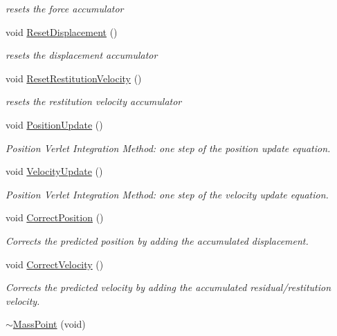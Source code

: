 \begin{DoxyCompactItemize}
\begin{DoxyCompactList}\small\item\em resets the force accumulator \end{DoxyCompactList}\item 
void \hyperlink{class_filum_1_1_mass_point_ade0c5dcd58e542d10a2976b891c3230b}{Reset\-Displacement} ()
\begin{DoxyCompactList}\small\item\em resets the displacement accumulator \end{DoxyCompactList}\item 
void \hyperlink{class_filum_1_1_mass_point_a368a05270d3a88e8dca67f89cd938ab9}{Reset\-Restitution\-Velocity} ()
\begin{DoxyCompactList}\small\item\em resets the restitution velocity accumulator \end{DoxyCompactList}\item 
void \hyperlink{class_filum_1_1_mass_point_ac2bc946eb3183d5404be4a737c737b96}{Position\-Update} ()
\begin{DoxyCompactList}\small\item\em Position Verlet Integration Method\-: one step of the position update equation. \end{DoxyCompactList}\item 
void \hyperlink{class_filum_1_1_mass_point_a6409c7f95c35c06aaa71fe7d4c74bddb}{Velocity\-Update} ()
\begin{DoxyCompactList}\small\item\em Position Verlet Integration Method\-: one step of the velocity update equation. \end{DoxyCompactList}\item 
void \hyperlink{class_filum_1_1_mass_point_a57df1385c39078fed74c243c8ec30618}{Correct\-Position} ()
\begin{DoxyCompactList}\small\item\em Corrects the predicted position by adding the accumulated displacement. \end{DoxyCompactList}\item 
void \hyperlink{class_filum_1_1_mass_point_afd82d4152069437ae997f090d5cd50ed}{Correct\-Velocity} ()
\begin{DoxyCompactList}\small\item\em Corrects the predicted velocity by adding the accumulated residual/restitution velocity. \end{DoxyCompactList}\item 
\hyperlink{class_filum_1_1_mass_point_ab3ded7c921f22b446d0d9688d51052c9}{$\sim$\-Mass\-Point} (void)
\end{DoxyCompactItemize}
